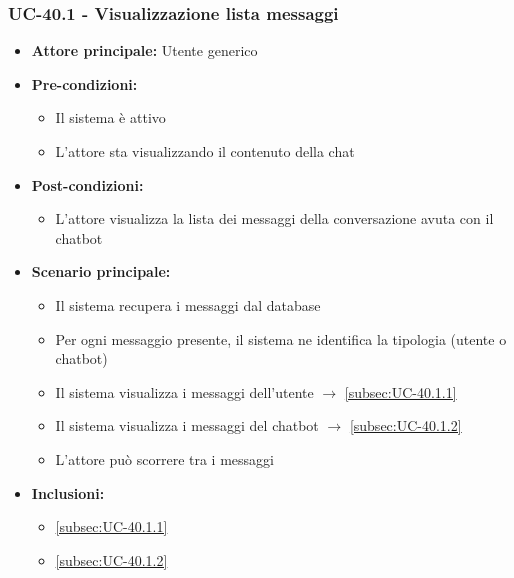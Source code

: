 \documentclass[a4paper,12pt]{article}
\begin{document}
\subsubsection{UC-40.1 - Visualizzazione lista messaggi} \label{subsec:UC-40.1}
\begin{itemize}
    \item \textbf{Attore principale:} Utente generico
    \item \textbf{Pre-condizioni:} 
    \begin{itemize}
        \item Il sistema è attivo
        \item L'attore sta visualizzando il contenuto della chat
    \end{itemize}
    \item \textbf{Post-condizioni:}
    \begin{itemize}
        \item L'attore visualizza la lista dei messaggi della conversazione avuta con il chatbot
    \end{itemize}
    \item \textbf{Scenario principale:} 
    \begin{itemize}
        \item Il sistema recupera i messaggi dal database
        \item Per ogni messaggio presente, il sistema ne identifica la tipologia (utente o chatbot)
        \item Il sistema visualizza i messaggi dell'utente $\rightarrow$ \ref{subsec:UC-40.1.1}
        \item Il sistema visualizza i messaggi del chatbot $\rightarrow$ \ref{subsec:UC-40.1.2}
        \item L'attore può scorrere tra i messaggi
    \end{itemize}
    \item \textbf{Inclusioni:}
    \begin{itemize}
        \item \ref{subsec:UC-40.1.1}
        \item \ref{subsec:UC-40.1.2}
    \end{itemize}
\end{itemize}
\end{document}
